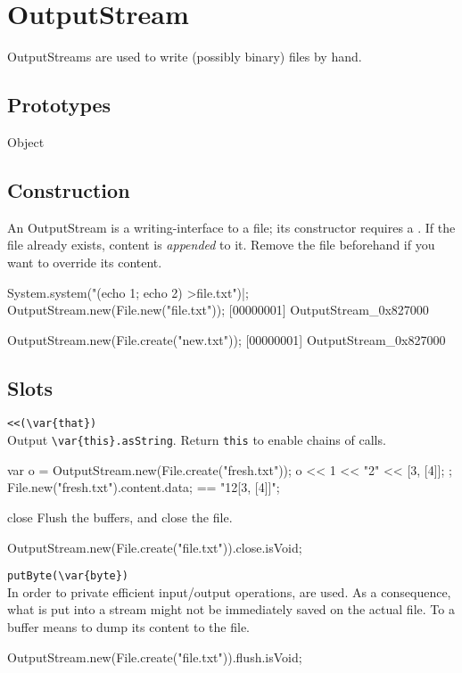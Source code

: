 \section{OutputStream}

OutputStreams are used to write (possibly binary) files by hand.

\subsection{Prototypes}
\begin{refObjects}
\item[Object]
\end{refObjects}

\subsection{Construction}

An OutputStream is a writing-interface to a file; its constructor
requires a .  If the file already exists, content is
\emph{appended} to it.  Remove the file beforehand if you want to
override its content.

\begin{urbiscript}[firstnumber=1]
System.system("(echo 1; echo 2) >file.txt")|;
OutputStream.new(File.new("file.txt"));
[00000001] OutputStream_0x827000

OutputStream.new(File.create("new.txt"));
[00000001] OutputStream_0x827000
\end{urbiscript}

\subsection{Slots}

\begin{urbiscriptapi}
\item \lstinline|<<(\var{that})|\\
  Output \lstinline|\var{this}.asString|.  Return \lstinline|this| to
  enable chains of calls.
\begin{urbiassert}
{
  {
    var o = OutputStream.new(File.create("fresh.txt"));
    o << 1 << "2" << [3, [4]];
  };
  File.new("fresh.txt").content.data;
}
==
"12[3, [4]]";
\end{urbiassert}

\item[close]
  Flush the buffers, and close the file.
\begin{urbiassert}
OutputStream.new(File.create("file.txt")).close.isVoid;
\end{urbiassert}

\item \lstinline|putByte(\var{byte})|\\
  In order to private efficient input/output operations,
   are used.  As a consequence, what is put into
  a stream might not be immediately saved on the actual file.  To
   a buffer means to dump its content to the file.
\begin{urbiassert}
OutputStream.new(File.create("file.txt")).flush.isVoid;
\end{urbiassert}
\end{urbiscriptapi}


